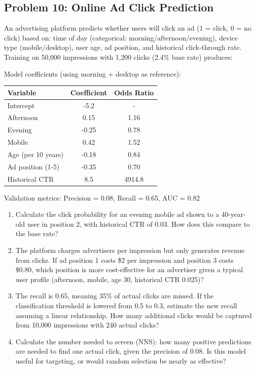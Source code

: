 \documentclass[12pt]{article}
\begin{document}
\subsection*{Problem 10: Online Ad Click Prediction}

An advertising platform predicts whether users will click an ad (1 = click, 0 = no click) based on: time of day (categorical: morning/afternoon/evening), device type (mobile/desktop), user age, ad position, and historical click-through rate. Training on 50,000 impressions with 1,200 clicks (2.4\% base rate) produces:

Model coefficients (using morning + desktop as reference):
\begin{center}
\begin{tabular}{lcc}
\toprule
Variable & Coefficient & Odds Ratio \\
\midrule
Intercept & -5.2 & - \\
Afternoon & 0.15 & 1.16 \\
Evening & -0.25 & 0.78 \\
Mobile & 0.42 & 1.52 \\
Age (per 10 years) & -0.18 & 0.84 \\
Ad position (1-5) & -0.35 & 0.70 \\
Historical CTR & 8.5 & 4914.8 \\
\bottomrule
\end{tabular}
\end{center}

Validation metrics: Precision = 0.08, Recall = 0.65, AUC = 0.82

\begin{enumerate}[label=(\alph*)]
\item Calculate the click probability for an evening mobile ad shown to a 40-year-old user in position 2, with historical CTR of 0.03. How does this compare to the base rate?

\item The platform charges advertisers per impression but only generates revenue from clicks. If ad position 1 costs \$2 per impression and position 3 costs \$0.80, which position is more cost-effective for an advertiser given a typical user profile (afternoon, mobile, age 30, historical CTR 0.025)?

\item The recall is 0.65, meaning 35\% of actual clicks are missed. If the classification threshold is lowered from 0.5 to 0.3, estimate the new recall assuming a linear relationship. How many additional clicks would be captured from 10,000 impressions with 240 actual clicks?

\item Calculate the number needed to screen (NNS): how many positive predictions are needed to find one actual click, given the precision of 0.08. Is this model useful for targeting, or would random selection be nearly as effective?
\end{enumerate}
\end{document}

